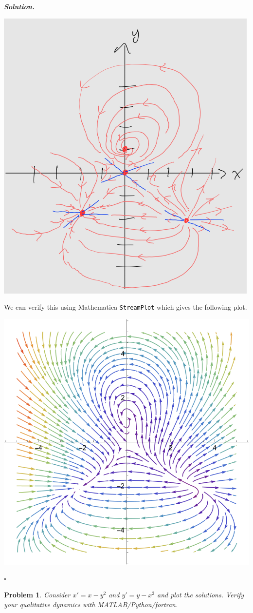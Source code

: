 \documentclass[12pt]{report}
\newtheorem{problem}{Problem}
\newenvironment{solution}[1][\it{Solution}]{\textbf{#1. } }{$\square$}
\begin{document}
\begin{solution}
    \begin{center}
        \includegraphics[width=.6\linewidth]{images/8hand.PNG}
    \end{center}

    We can verify this using Mathematica \verb+StreamPlot+ which gives the following plot.

    \begin{center}
       \includegraphics[width=.6\linewidth]{images/8.png}
    \end{center}
    

\end{solution}

\newpage



\begin{problem}
    Consider $x' = x - y^2$ and $y' = y - x^2$ and plot the solutions. Verify your qualitative dynamics with MATLAB/Python/fortran.
\end{problem}
\end{document}
